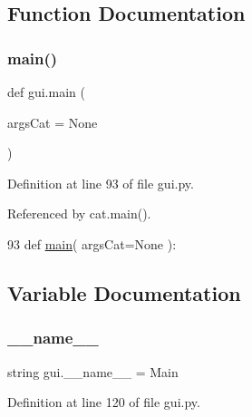 \subsection{Function Documentation}
\mbox{\label{namespacegui_a24d9f88c60ee52fd5381ea6f83ca2adb}} 
\subsubsection{\texorpdfstring{main()}{main()}}
{\footnotesize\ttfamily def gui.\+main (\begin{DoxyParamCaption}\item[{}]{args\+Cat = {\ttfamily None} }\end{DoxyParamCaption})}



Definition at line 93 of file gui.\+py.



Referenced by cat.\+main().


\begin{DoxyCode}
93 \textcolor{keyword}{def }\hyperlink{Server__NI6008_8cpp_a0ddf1224851353fc92bfbff6f499fa97}{main}( argsCat=None ):
\end{DoxyCode}


\subsection{Variable Documentation}
\mbox{\label{namespacegui_af1dfb6646e7fc2148ca23c3900a8b5e3}} 
\subsubsection{\texorpdfstring{\+\_\+\+\_\+name\+\_\+\+\_\+}{\_\_name\_\_}}
{\footnotesize\ttfamily string gui.\+\_\+\+\_\+name\+\_\+\+\_\+ = \textquotesingle{}Main\textquotesingle{}\hspace{0.3cm}{\ttfamily [private]}}



Definition at line 120 of file gui.\+py.

\mbox{\label{namespacegui_ad76e7b18f23e1dbbdee8133fc097dbc9}} 
